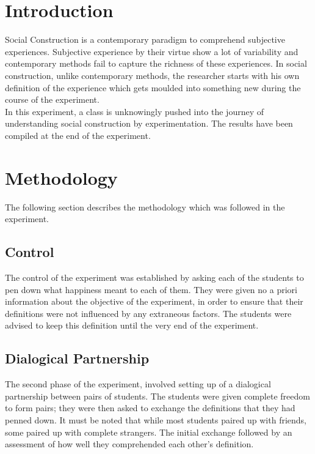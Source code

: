 \documentclass[twoside]{article}
\begin{document}
\begin{multicols}{2} %

\section{Introduction}

\lettrine[nindent=0em,lines=3]{S} ocial Construction is a contemporary paradigm to 
comprehend subjective experiences. Subjective experience by their virtue show a lot
of variability and contemporary methods fail to capture the richness of these experiences.
In social construction, unlike contemporary methods, the researcher starts with his own
definition of the experience which gets moulded into something new during the course of the
experiment.\\
In this experiment, a class is unknowingly pushed into the journey of understanding 
social construction by experimentation. The results have been compiled at the end of the experiment.


\section{Methodology}
The following section describes the methodology which was followed in the experiment.

\subsection{Control}
The control of the experiment was established by asking each of the students to pen down
what happiness meant to each of them. They were given no a priori information about the
objective of the experiment, in order to ensure that their definitions were not influenced
by any extraneous factors.
The students were advised to keep this definition until the very end of the experiment.

\subsection{Dialogical Partnership}
The second phase of the experiment, involved setting up of a dialogical partnership between
pairs of students. The students were given complete freedom to form pairs; they were then asked
to exchange the definitions that they had penned down. It must be noted that while most students
paired up with friends, some paired up with complete strangers.
The initial exchange followed by an assessment of how well they comprehended each other's definition.


\end{multicols}
\end{document}
